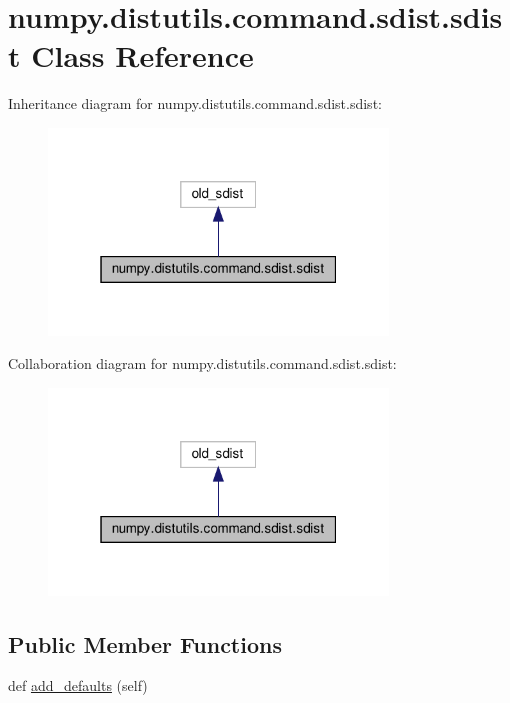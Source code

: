 \hypertarget{classnumpy_1_1distutils_1_1command_1_1sdist_1_1sdist}{}\section{numpy.\+distutils.\+command.\+sdist.\+sdist Class Reference}
\label{classnumpy_1_1distutils_1_1command_1_1sdist_1_1sdist}


Inheritance diagram for numpy.\+distutils.\+command.\+sdist.\+sdist\+:
\nopagebreak
\begin{figure}[H]
\begin{center}
\leavevmode
\includegraphics[width=256pt]{classnumpy_1_1distutils_1_1command_1_1sdist_1_1sdist__inherit__graph}
\end{center}
\end{figure}


Collaboration diagram for numpy.\+distutils.\+command.\+sdist.\+sdist\+:
\nopagebreak
\begin{figure}[H]
\begin{center}
\leavevmode
\includegraphics[width=256pt]{classnumpy_1_1distutils_1_1command_1_1sdist_1_1sdist__coll__graph}
\end{center}
\end{figure}
\subsection*{Public Member Functions}
\begin{DoxyCompactItemize}
\item 
def \hyperlink{classnumpy_1_1distutils_1_1command_1_1sdist_1_1sdist_a1b3f0f49b828144827999723be947986}{add\+\_\+defaults} (self)
\end{DoxyCompactItemize}


